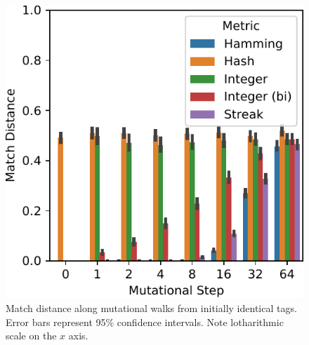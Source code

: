 \begin{figure}
\begin{center}

\includegraphics[width=\textwidth]{img/mutational_walk/bitweight=0dot5+seed=1+title=mutational_walk_barplot+_data_hathash_hash=8bf152d87daa9cb7+_script_fullcat_hash=982405ca713eba73+ext=}
\caption{
Match distance along mutational walks from initially identical tags.
Error bars represent 95\% confidence intervals.
Note lotharithmic scale on the $x$ axis.
}
\label{fig:mutational_walk_barplot}

\end{center}
\end{figure}
